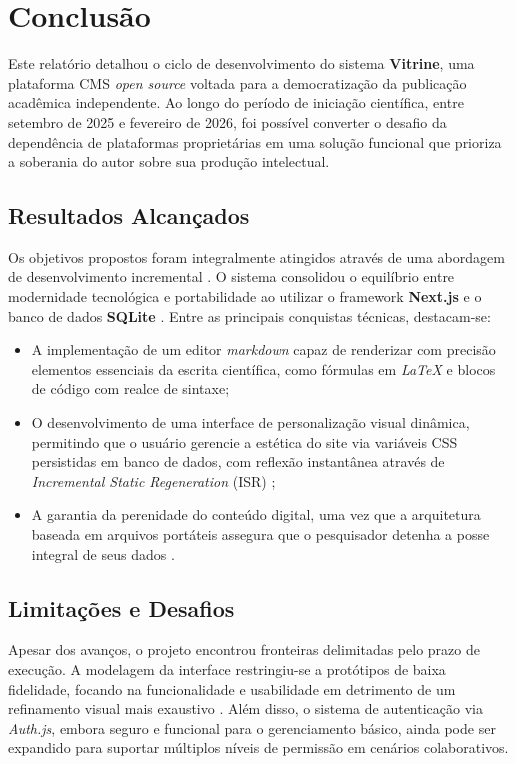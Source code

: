 \chapter{Conclusão}\label{cap:conclusao}

Este relatório detalhou o ciclo de desenvolvimento do sistema \textbf{Vitrine}, uma plataforma CMS \textit{open source} voltada para a democratização da publicação acadêmica independente. Ao longo do período de iniciação científica, entre setembro de 2025 e fevereiro de 2026, foi possível converter o desafio da dependência de plataformas proprietárias em uma solução funcional que prioriza a soberania do autor sobre sua produção intelectual.

\section{Resultados Alcançados}

Os objetivos propostos foram integralmente atingidos através de uma abordagem de desenvolvimento incremental \cite{Sommerville2011}. O sistema consolidou o equilíbrio entre modernidade tecnológica e portabilidade ao utilizar o framework \textbf{Next.js} e o banco de dados \textbf{SQLite} \cite{nextjs_docs, prisma_docs}. Entre as principais conquistas técnicas, destacam-se:

\begin{itemize}
    \item A implementação de um editor \textit{markdown} capaz de renderizar com precisão elementos essenciais da escrita científica, como fórmulas em \textit{LaTeX} e blocos de código com realce de sintaxe;
    \item O desenvolvimento de uma interface de personalização visual dinâmica, permitindo que o usuário gerencie a estética do site via variáveis CSS persistidas em banco de dados, com reflexão instantânea através de \textit{Incremental Static Regeneration} (ISR) \cite{nextjs_docs};
    \item A garantia da perenidade do conteúdo digital, uma vez que a arquitetura baseada em arquivos portáteis assegura que o pesquisador detenha a posse integral de seus dados \cite{prisma_docs}.
\end{itemize}

\section{Limitações e Desafios}

Apesar dos avanços, o projeto encontrou fronteiras delimitadas pelo prazo de execução. A modelagem da interface restringiu-se a protótipos de baixa fidelidade, focando na funcionalidade e usabilidade em detrimento de um refinamento visual mais exaustivo \cite{Sommerville2011}. Além disso, o sistema de autenticação via \textit{Auth.js}, embora seguro e funcional para o gerenciamento básico, ainda pode ser expandido para suportar múltiplos níveis de permissão em cenários colaborativos.

